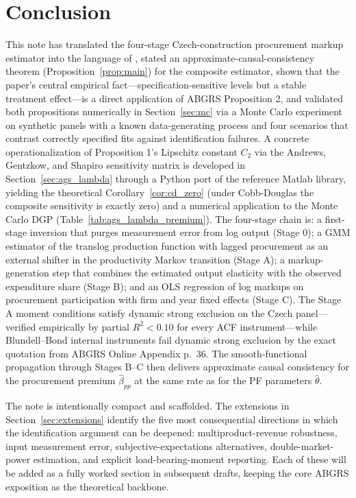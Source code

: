 \documentclass[11pt]{article}
\begin{document}
\section{Conclusion}\label{sec:conclusion}

This note has translated the four-stage Czech-construction procurement markup estimator into the language of \citet{ABGRS2025}, stated an approximate-causal-consistency theorem (Proposition~\ref{prop:main}) for the composite estimator, shown that the paper's central empirical fact---specification-sensitive levels but a stable treatment effect---is a direct application of ABGRS Proposition 2, and validated both propositions numerically in Section~\ref{sec:mc} via a Monte Carlo experiment on synthetic panels with a known data-generating process and four scenarios that contrast correctly specified fits against identification failures. A concrete operationalization of Proposition 1's Lipschitz constant $C_2$ via the Andrews, Gentzkow, and Shapiro \cite{AGS2017} sensitivity matrix is developed in Section~\ref{sec:ags_lambda} through a Python port of the reference Matlab library, yielding the theoretical Corollary~\ref{cor:cd_zero} (under Cobb-Douglas the composite sensitivity is exactly zero) and a numerical application to the Monte Carlo DGP (Table~\ref{tab:ags_lambda_premium}). The four-stage chain is: a first-stage inversion that purges measurement error from log output (Stage 0); a GMM estimator of the translog production function with lagged procurement as an external shifter in the productivity Markov transition (Stage A); a markup-generation step that combines the estimated output elasticity with the observed expenditure share (Stage B); and an OLS regression of log markups on procurement participation with firm and year fixed effects (Stage C). The Stage A moment conditions satisfy dynamic strong exclusion on the Czech panel---verified empirically by partial $R^2 < 0.10$ for every ACF instrument---while Blundell--Bond internal instruments fail dynamic strong exclusion by the exact quotation from ABGRS Online Appendix p.~36. The smooth-functional propagation through Stages B--C then delivers approximate causal consistency for the procurement premium $\hat\beta_{pp}$ at the same rate as for the PF parameters $\hat\theta$.

The note is intentionally compact and scaffolded. The extensions in Section~\ref{sec:extensions} identify the five most consequential directions in which the identification argument can be deepened: multiproduct-revenue robustness, input measurement error, subjective-expectations alternatives, double-market-power estimation, and explicit load-bearing-moment reporting. Each of these will be added as a fully worked section in subsequent drafts, keeping the core ABGRS exposition as the theoretical backbone.
\end{document}
